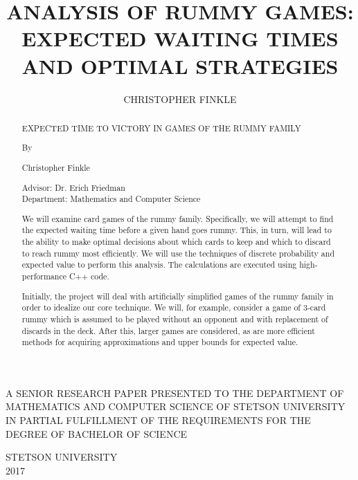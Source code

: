 \documentclass[letter,12pt]{article}
\begin{document}
\begin{titlepage}
\title{\uppercase{Analysis of Rummy Games: Expected Waiting Times and Optimal Strategies}}
\author{\uppercase{Christopher Finkle}}
\date{}
\maketitle
\vspace{8cm}
\begin{center}A SENIOR RESEARCH PAPER PRESENTED TO THE DEPARTMENT OF MATHEMATICS AND COMPUTER SCIENCE OF STETSON UNIVERSITY IN PARTIAL FULFILLMENT OF THE REQUIREMENTS FOR THE DEGREE OF BACHELOR OF SCIENCE\\
\end{center}
\begin{center}
STETSON UNIVERSITY\\
2017\end{center}
\thispagestyle{empty}
\end{titlepage}

\newpage
\begin{titlepage}
\tableofcontents
\end{titlepage}
\newpage
\listoffigures
\newpage

\begin{abstract}
\begin{center}
EXPECTED TIME TO VICTORY IN GAMES OF THE RUMMY FAMILY 
 
By 
 
Christopher Finkle 
\end{center}  
Advisor: Dr. Erich Friedman\\
Department: Mathematics and Computer Science\\
\smallskip

We will examine card games of the rummy family. Specifically, we will attempt to find the expected waiting time before a given hand goes rummy. This, in turn, will lead to the ability to make optimal decisions about which cards to keep and which to discard to reach rummy most efficiently. We will use the techniques of discrete probability and expected value to perform this analysis. The calculations are executed using high-performance C++ code.

Initially, the project will deal with artificially simplified games of the rummy family in order to idealize our core technique. We will, for example, consider a game of 3-card rummy which is assumed to be played without an opponent and with replacement of discards in the deck. After this, larger games are considered, as are more efficient methods for acquiring approximations and upper bounds for expected value.
\end{abstract}
\end{document}
